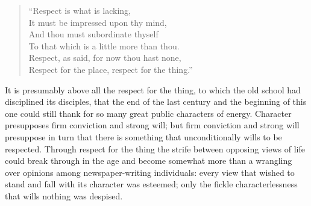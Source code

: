 \documentclass[12pt,a4paper,openany]{book}
\newcommand{\opage}[1]{\marginnote{\footnotesize\textit{[#1]}}}
\begin{document}
\begin{quote}
``Respect is what is lacking,\\
It must be impressed upon thy mind,\\
And thou must subordinate thyself\\
To that which is a little more than thou.\\
Respect, as said, for now thou hast none,\\
Respect for the place, respect for the thing.''
\end{quote}

It is presumably above all the respect for the thing, to which the
old school had disciplined its disciples, that the end
of the last century and the beginning of this one
could still thank for so many great public characters of energy.
Character presupposes firm
\setcounter{footnote}{0}%
\opage{415}conviction and strong will; but firm conviction and
strong will presuppose in turn that there is something that
unconditionally wills to be respected. Through respect for the thing
the strife between opposing views of life could break through
in the age and become somewhat more than a wrangling over opinions
among newspaper-writing individuals: every view that wished to
stand and fall with its character was esteemed; only
the fickle characterlessness that wills nothing was despised.
\end{document}
